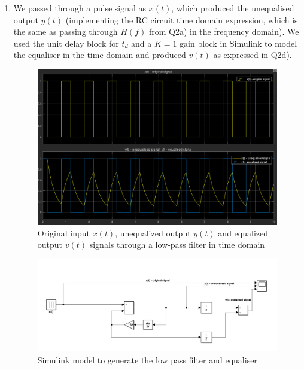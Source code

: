 \documentclass[11pt]{article}
\begin{document}
\begin{enumerate}[label=(\alph*)]
\item %
We passed through a pulse signal as $x(t)$, which produced the unequalised output $y(t)$ (implementing the RC circuit time domain expression, which is the same as passing through $H(f)$ from Q2a) in the frequency domain). We used the unit delay block for $t_d$ and a $K=1$ gain block in Simulink to model the equaliser in the time domain and produced $v(t)$ as expressed in Q2d).\\
    \begin{figure}[H]
        \centering
        \includegraphics[scale=0.5]{W1Q2e.png}
        \caption{\label{fig:q2e}Original input $x(t)$, unequalized output $y(t)$ and equalized output $v(t)$ signals through a low-pass filter in time domain}
    \end{figure}
    \begin{figure}[ht!]
    \centering
        \includegraphics[scale=0.5]{W1Q2e_SimuLink.png}
        \caption{\label{fig:q2eblocks}Simulink model to generate the low pass filter and equaliser}
    \end{figure}
 

\end{enumerate}
\end{document}
